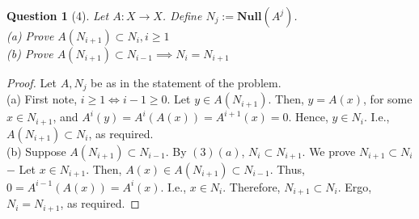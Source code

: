 \documentclass[11pt]{article}
\theoremstyle{quest}
\newtheorem*{question}{Question}
\begin{document}
\begin{question}[4]
Let $A: X \rightarrow X$. Define $N_j := \mathbf{Null}(A^j)$.
\\(a) Prove $A(N_{i+1}) \subset N_i, i \ge 1$
\\(b) Prove $A(N_{i+1}) \subset N_{i-1} \implies N_i = N_{i+1}$
\end{question}
\begin{proof}
Let $A, N_j$ be as in the statement of the problem.
  \\(a) First note, $i \ge 1 \iff i-1 \ge 0$. Let $y \in A(N_{i+1})$. Then, $ y = A(x)$, for some $x \in N_{i+1}$, and $A^i(y) = A^i(A(x)) = A^{i+1}(x) = 0$. Hence, $y \in N_i$. I.e., $A(N_{i+1}) \subset N_i$, as required.
  \\(b) Suppose $A(N_{i+1}) \subset N_{i-1}$. By $(3)(a)$, $N_i \subset N_{i+1}$. We prove $N_{i+1} \subset N_i$ $-$ Let $x \in N_{i+1}$. Then, $A(x) \in A(N_{i+1}) \subset N_{i-1}$. Thus, $0 = A^{i-1}(A(x)) = A^i(x)$. I.e., $x \in N_i$. Therefore, $N_{i+1} \subset N_i$. Ergo, $N_i = N_{i+1}$, as required.
\end{proof}
\end{document}
